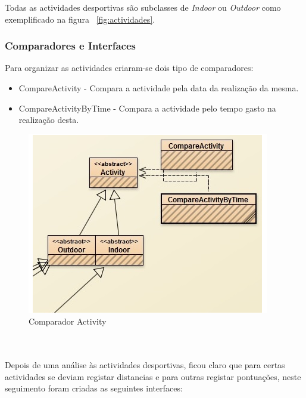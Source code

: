 \documentclass[10pt,notitlepage]{article}
\begin{document}
Todas as actividades desportivas são subclasses de \textit{Indoor} ou \textit{Outdoor} como exemplificado na figura ~\ref{fig:actividades}.

\subsubsection{Comparadores e Interfaces}
Para organizar as actividades criaram-se dois tipo de comparadores:
\begin{itemize}
\item CompareActivity - Compara a actividade pela data da realização da mesma.
\item CompareActivityByTime - Compara a actividade pelo tempo gasto na realização desta.
\end{itemize}

\begin{figure}[ht]
\centering
\includegraphics[scale=1]{ComparadorActivity.png}
\caption{Comparador Activity}
\end{figure}

~\\~\\

Depois de uma análise às actividades desportivas, ficou claro que para certas actividades se deviam registar distancias e para outras registar pontuações, neste seguimento foram criadas as seguintes interfaces:
\end{document}
